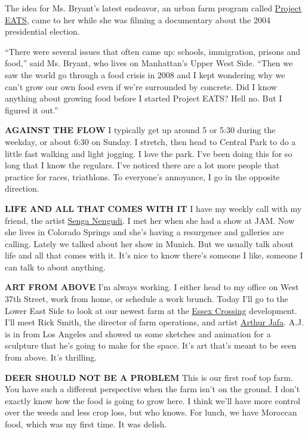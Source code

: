 The idea for Ms. Bryant's latest endeavor, an urban farm program called
\href{http://projecteats.org/}{Project EATS}, came to her while she was
filming a documentary about the 2004 presidential election.

``There were several issues that often came up: schools, immigration,
prisons and food,'' said Ms. Bryant, who lives on Manhattan's Upper West
Side. ``Then we saw the world go through a food crisis in 2008 and I
kept wondering why we can't grow our own food even if we're surrounded
by concrete. Did I know anything about growing food before I started
Project EATS? Hell no. But I figured it out.''

\textbf{AGAINST THE FLOW} I typically get up around 5 or 5:30 during the
weekday, or about 6:30 on Sunday. I stretch, then head to Central Park
to do a little fast walking and light jogging. I love the park. I've
been doing this for so long that I know the regulars. I've noticed there
are a lot more people that practice for races, triathlons. To everyone's
annoyance, I go in the opposite direction.

\textbf{LIFE AND ALL THAT COMES WITH IT} I have my weekly call with my
friend, the artist \href{http://sengasenga.com/}{Senga Nengudi}. I met
her when she had a show at JAM. Now she lives in Colorado Springs and
she's having a resurgence and galleries are calling. Lately we talked
about her show in Munich. But we usually talk about life and all that
comes with it. It's nice to know there's someone I like, someone I can
talk to about anything.

\textbf{ART FROM ABOVE} I'm always working. I either head to my office
on West 37th Street, work from home, or schedule a work brunch. Today
I'll go to the Lower East Side to look at our newest farm at the
\href{https://www.essexcrossingnyc.com/}{Essex Crossing} development.
I'll meet Rick Smith, the director of farm operations, and artist
\href{https://www.nytimes.com/2019/08/14/t-magazine/arthur-jafa-in-bloom.html}{Arthur
Jafa}. A.J. is in from Los Angeles and showed us some sketches and
animation for a sculpture that he's going to make for the space. It's
art that's meant to be seen from above. It's thrilling.

\textbf{DEER SHOULD NOT BE A PROBLEM} This is our first roof top farm.
You have such a different perspective when the farm isn't on the ground.
I don't exactly know how the food is going to grow here. I think we'll
have more control over the weeds and less crop loss, but who knows. For
lunch, we have Moroccan food, which was my first time. It was delish.

